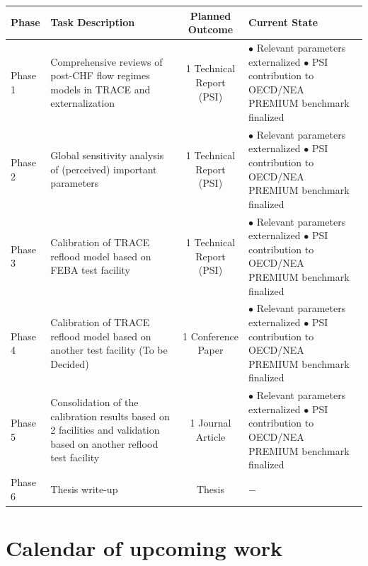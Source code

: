 \documentclass[11pt,titlepage]{article}
\begin{document}
\begin{table}[!h]
    \begin{center}
        \begin{tabular}{  l  p{5cm}  c  p{5cm}}
        \toprule
        \bf{Phase} & \bf{Task Description} & \bf{Planned Outcome} & \bf{Current State} \\\toprule
                     Phase 1
                   & Comprehensive reviews of post-CHF flow regimes models in TRACE
                     and externalization               
                   &   1 Technical Report (PSI)                
                   & $\bullet$ Relevant parameters externalized 
                     $\bullet$ PSI contribution to OECD/NEA PREMIUM benchmark finalized \\\midrule
                     Phase 2
                   & Global sensitivity analysis of (perceived) important
                     parameters               
                   &   1 Technical Report (PSI)                
                   & $\bullet$ Relevant parameters externalized 
                     $\bullet$ PSI contribution to OECD/NEA PREMIUM benchmark finalized \\\midrule
                     Phase 3
                   & Calibration of TRACE reflood model based on FEBA test 
                     facility               
                   &   1 Technical Report (PSI)                
                   & $\bullet$ Relevant parameters externalized 
                     $\bullet$ PSI contribution to OECD/NEA PREMIUM benchmark finalized \\\midrule
                     Phase 4
                   & Calibration of TRACE reflood model based on another test
                     facility (To be Decided)               
                   & 1 Conference Paper                
                   & $\bullet$ Relevant parameters externalized 
                     $\bullet$ PSI contribution to OECD/NEA PREMIUM benchmark finalized \\\midrule
                     Phase 5
                   & Consolidation of the calibration results based on 
                     2 facilities and validation based on
                     another reflood test facility              
                   & 1 Journal Article            
                   & $\bullet$ Relevant parameters externalized 
                     $\bullet$ PSI contribution to OECD/NEA PREMIUM benchmark finalized \\\midrule 
                     Phase 6
                   & Thesis write-up               
                   & Thesis                
                   & $-$\\
                     \bottomrule    
    \end{tabular}
\end{center}
\end{table}


\section{Calendar of upcoming work}
\end{document}
